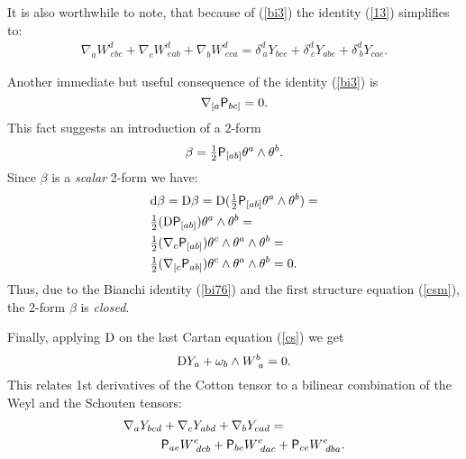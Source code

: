 \documentclass[letterpaper]{amsart}
\theoremstyle{definition}
\theoremstyle{remark}
\newcommand{\be}{\begin{equation}}
\newcommand{\ee}{\end{equation}}
\newcommand{\D}{{\rm D}}
\newcommand{\dz}{\wedge}
\newcommand{\der}{{\rm d}}
\newcommand{\Rho}{{\mbox{\sf P}}}
\begin{document}
It is also worthwhile to note, that because of (\ref{bi3}) the
identity (\ref{13}) simplifies to:
\be
\begin{aligned}
\nabla_a W^d_{~ebc}+\nabla_c W^d_{~eab}+\nabla_b W^d_{~eca}=\delta^d_{~a}Y_{bce}+\delta^d_{~c}Y_{abe}+\delta^d_{~b}Y_{cae}.
\end{aligned}
\ee

Another immediate but useful consequence of the
identity (\ref{bi3}) is 
\be
\nabla_{[a}\Rho_{bc]}=0.\label{bi76}\ee
This fact suggests an introduction of a 2-form 
$$\beta=\tfrac12\Rho_{[ab]}\theta^a\dz\theta^b.$$
Since $\beta$ is a \emph{scalar} 2-form we have:
$$\begin{aligned}
&\der\beta=\D\beta=\D(\tfrac12\Rho_{[ab]}\theta^a\dz\theta^b)=\\
&\tfrac12(\D\Rho_{[ab]})\theta^a\dz\theta^b=\\
&\tfrac12(\nabla_c\Rho_{[ab]})\theta^c\dz\theta^a\dz\theta^b=\\
&\tfrac12(\nabla_{[c}\Rho_{ab]})\theta^c\dz\theta^a\dz\theta^b=0.\end{aligned}$$
Thus, due to the Bianchi identity (\ref{bi76}) and the first structure
equation (\ref{csm}), the 2-form $\beta$ is
\emph{closed}. 

Finally, applying $\D$ on the last Cartan equation (\ref{cs}) we get
$$\D Y_a+\omega_b\dz W^b_{~a}=0.$$
This relates 1st derivatives of the Cotton tensor to a bilinear
combination of the Weyl and the 
Schouten tensors:
\be\begin{aligned}
&\nabla_aY_{bcd}+\nabla_cY_{abd}+\nabla_bY_{cad}=\\
&\quad\quad\quad\Rho_{ae}W^e_{~dcb}+\Rho_{be}W^e_{~dac}+\Rho_{ce}W^e_{~dba}.
\end{aligned}\ee
\end{document}
